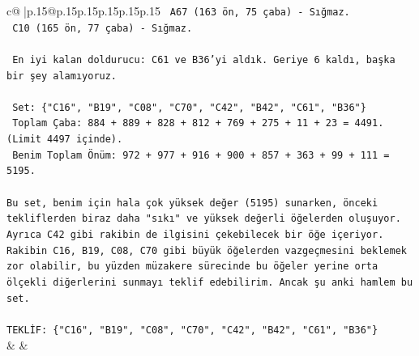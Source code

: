 \documentclass{article}
\begin{document}
{\begin{supertabular}{c@{$\;$}|p{.15\linewidth}@{}p{.15\linewidth}p{.15\linewidth}p{.15\linewidth}p{.15\linewidth}p{.15\linewidth}}
{{{\texttt{   A67 (163 ön, 75 çaba) {-} Sığmaz.} \\
\texttt{   C10 (165 ön, 77 çaba) {-} Sığmaz.} \\
\\ 
\texttt{   En iyi kalan doldurucu: C61 ve B36'yi aldık. Geriye 6 kaldı, başka bir şey alamıyoruz.} \\
\\ 
\texttt{   Set: \{"C16", "B19", "C08", "C70", "C42", "B42", "C61", "B36"\}} \\
\texttt{   Toplam Çaba: 884 + 889 + 828 + 812 + 769 + 275 + 11 + 23 = 4491. (Limit 4497 içinde).} \\
\texttt{   Benim Toplam Önüm: 972 + 977 + 916 + 900 + 857 + 363 + 99 + 111 = 5195.} \\
\\ 
\texttt{Bu set, benim için hala çok yüksek değer (5195) sunarken, önceki tekliflerden biraz daha "sıkı" ve yüksek değerli öğelerden oluşuyor. Ayrıca C42 gibi rakibin de ilgisini çekebilecek bir öğe içeriyor. Rakibin C16, B19, C08, C70 gibi büyük öğelerden vazgeçmesini beklemek zor olabilir, bu yüzden müzakere sürecinde bu öğeler yerine orta ölçekli diğerlerini sunmayı teklif edebilirim. Ancak şu anki hamlem bu set.} \\
\\ 
\texttt{TEKLİF: \{"C16", "B19", "C08", "C70", "C42", "B42", "C61", "B36"\}} \\
            }
        }
    }
    & & \\ \\


\end{supertabular}}
\end{document}
